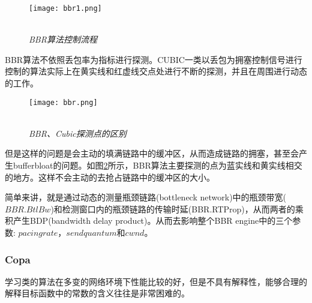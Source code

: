 \documentclass[a4paper, 12pt, UTF8]{ctexart}
\begin{document}
\begin{figure}[H]
	\centering \texttt{[image: bbr1.png]}
	\\ \hspace*{\fill} \\
	\caption{\em BBR算法控制流程}
	\label{fig:BBR process}
\end{figure}

\par BBR算法不依照丢包率为指标进行探测。CUBIC一类以丢包为拥塞控制信号进行控制的算法实际上在黄实线和红虚线交点处进行不断的探测，并且在周围进行动态的工作。

\begin{figure}[H]
	\centering \texttt{[image: bbr.png]}
	\\ \hspace*{\fill} \\
	\caption{\em BBR、Cubic探测点的区别}
	\label{fig:BBR algorithm}
\end{figure}
\par 但是这样的问题是会主动的填满链路中的缓冲区，从而造成链路的拥塞，甚至会产生bufferbloat的问题。如图\ref{fig:BBR algorithm}所示，BBR算法主要探测的点为蓝实线和黄实线相交的地方。这样不会主动的去抢占链路中的缓冲区的大小。

\par 简单来讲，就是通过动态的测量瓶颈链路(bottleneck network)中的瓶颈带宽($BBR.BtlBw$)和检测窗口内的瓶颈链路的传输时延(BBR.RTProp)，从而两者的乘积产生BDP(bandwidth delay product)。从而去影响整个BBR engine中的三个参数: $pacing rate$，$send quantum$和$cwnd$。



\subsubsection{Copa}

\par 学习类的算法在多变的网络环境下性能比较的好，但是不具有解释性\cite{DongMZAGGS18}，能够合理的解释目标函数中的常数的含义往往是非常困难的。
\end{document}
